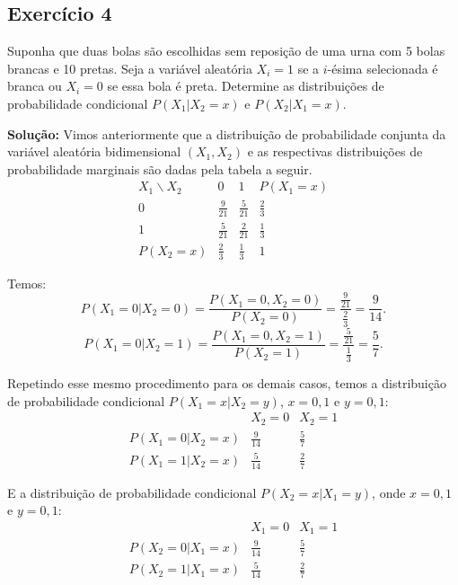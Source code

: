 \documentclass{article}
\begin{document}
\subsection{Exercício 4}
Suponha que duas bolas são escolhidas sem reposição de uma urna com 5 bolas brancas e 10 pretas. Seja a variável aleatória $X_i = 1$ se a $i$-ésima selecionada é branca ou $X_i = 0$ se essa bola é preta. Determine as distribuições de probabilidade condicional $P(X_1|X_2 = x)$ e $P(X_2|X_1 = x)$.

\vspace{0.5cm}
\textbf{Solução:} Vimos anteriormente que a distribuição de probabilidade conjunta da variável aleatória bidimensional $(X_1, X_2)$ e as respectivas distribuições de probabilidade marginais são dadas pela tabela a seguir.
    \[
    \begin{array}{c|cc|c}
    X_1\backslash X_2 & 0 & 1 & P(X_1 = x) \\
    \hline
    0 & \frac{9}{21} & \frac{5}{21} & \frac{2}{3} \\
    1 & \frac{5}{21} & \frac{2}{21} & \frac{1}{3} \\
    \hline
    P(X_2 = x) & \frac{2}{3} & \frac{1}{3} & 1
    \end{array}
    \]

Temos:  
    \[
    P(X_1 = 0|X_2 = 0) = \frac{P(X_1 = 0, X_2 = 0)}{P(X_2 = 0)} = 
    \frac{\frac{9}{21}}{\frac{2}{3}} = \frac{9}{14}.
    \]
    \[
    P(X_1 = 0|X_2 = 1) = \frac{P(X_1 = 0, X_2 = 1)}{P(X_2 = 1)} = 
    \frac{\frac{5}{21}}{\frac{1}{3}} = \frac{5}{7}.
    \]
    
Repetindo esse mesmo procedimento para os demais casos, temos a distribuição de probabilidade condicional 
$P(X_1 = x|X_2 = y)$, $x = 0, 1$ e $y = 0, 1$:
    \[
    \begin{array}{c|cc}
    & X_2 = 0 & X_2 = 1 \\
    \hline
    P(X_1 = 0|X_2 = x) & \frac{9}{14} & \frac{5}{7} \\
    P(X_1 = 1|X_2 = x) & \frac{5}{14} & \frac{2}{7}
    \end{array}
    \]

E a distribuição de probabilidade condicional 
$P(X_2 = x|X_1 = y)$, onde $x = 0, 1$ e $y = 0, 1$:
    \[
    \begin{array}{c|cc}
    & X_1 = 0 & X_1 = 1 \\
    \hline
    P(X_2 = 0|X_1 = x) & \frac{9}{14} & \frac{5}{7} \\
    P(X_2 = 1|X_1 = x) & \frac{5}{14} & \frac{2}{7}
    \end{array}
    \]
\end{document}
